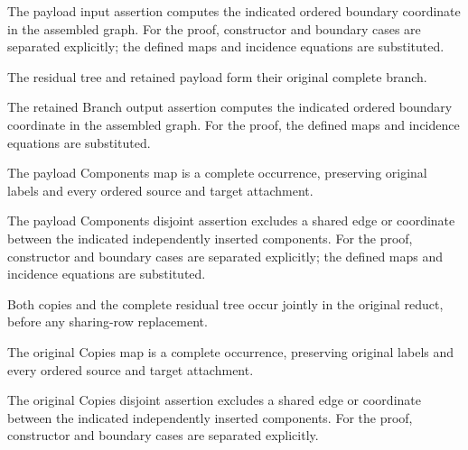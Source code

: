 The payload input assertion computes the indicated ordered boundary coordinate in the assembled graph.
For the proof, constructor and boundary cases are separated explicitly; the defined maps and incidence equations are substituted.
\par{}

The residual tree and retained payload form their original complete branch.
\par{}

The retained Branch output assertion computes the indicated ordered boundary coordinate in the assembled graph.
For the proof, the defined maps and incidence equations are substituted.
\par{}

The payload Components map is a complete occurrence, preserving original labels and every ordered source and target attachment.
\par{}

The payload Components disjoint assertion excludes a shared edge or coordinate between the indicated independently inserted components.
For the proof, constructor and boundary cases are separated explicitly; the defined maps and incidence equations are substituted.
\par{}

Both copies and the complete residual tree occur jointly in the original reduct, before any sharing-row replacement.
\par{}

The original Copies map is a complete occurrence, preserving original labels and every ordered source and target attachment.
\par{}

The original Copies disjoint assertion excludes a shared edge or coordinate between the indicated independently inserted components.
For the proof, constructor and boundary cases are separated explicitly.
\par{}

